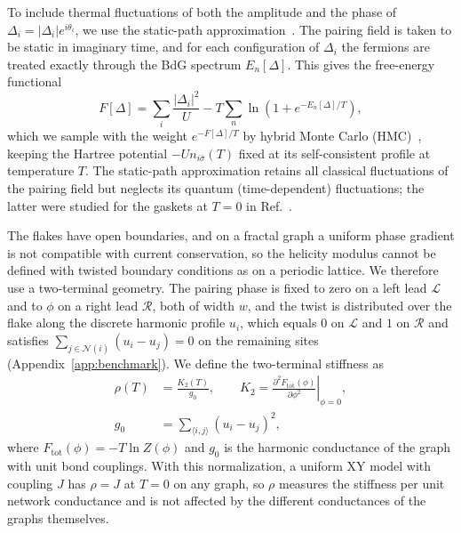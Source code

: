 \documentclass[aps,prb,twocolumn,superscriptaddress,floatfix]{revtex4-2}
\begin{document}
To include thermal fluctuations of both the amplitude and the phase of
$\Delta_i = |\Delta_i|e^{i\theta_i}$, we use the static-path
approximation~\cite{MASD05,DMA07,EM10}. The pairing field is taken to be
static in imaginary time, and for each configuration of $\Delta_i$ the
fermions are treated exactly through the BdG spectrum $E_n[\Delta]$. This gives
the free-energy functional
\begin{equation}
F[\Delta] = \sum_i \frac{|\Delta_i|^2}{U} - T\sum_n \ln\left(1 + e^{-E_n[\Delta]/T}\right),
\label{eq:F_static_path}
\end{equation}
which we sample with the weight $e^{-F[\Delta]/T}$ by hybrid Monte Carlo
(HMC)~\cite{DKPR87,Nea11}, keeping the Hartree potential
$-U n_{i\bar{\sigma}}(T)$ fixed at its self-consistent profile at temperature
$T$. The static-path approximation retains all classical fluctuations of the
pairing field but neglects its quantum (time-dependent) fluctuations; the
latter were studied for the gaskets at $T = 0$ in
Ref.~\cite{Canyellas2026quantum}.

The flakes have open boundaries, and on a fractal graph a uniform phase
gradient is not compatible with current conservation, so the helicity modulus
cannot be defined with twisted boundary conditions as on a periodic lattice.
We therefore use a two-terminal geometry. The pairing phase is fixed to zero
on a left lead $\mathcal{L}$ and to $\phi$ on a right lead $\mathcal{R}$, both
of width $w$, and the twist is distributed over the flake along the discrete
harmonic profile $u_i$, which equals $0$ on $\mathcal{L}$ and $1$ on
$\mathcal{R}$ and satisfies $\sum_{j \in \mathcal{N}(i)}(u_i - u_j) = 0$ on
the remaining sites (Appendix~\ref{app:benchmark}). We define the
two-terminal stiffness as
\begin{equation}
\begin{aligned}
\rho(T) &= \frac{K_2(T)}{g_0}, \qquad K_2 = \left.\frac{\partial^2 F_{\mathrm{tot}}(\phi)}{\partial\phi^2}\right|_{\phi=0}, \\
g_0 &= \sum_{\langle i,j\rangle}(u_i - u_j)^2,
\end{aligned}
\label{eq:rho_main}
\end{equation}
where $F_{\mathrm{tot}}(\phi) = -T\ln Z(\phi)$ and $g_0$ is the harmonic
conductance of the graph with unit bond couplings. With this normalization, a
uniform XY model with coupling $J$ has $\rho = J$ at $T = 0$ on any graph, so
$\rho$ measures the stiffness per unit network conductance and is not affected
by the different conductances of the graphs themselves.
\end{document}
